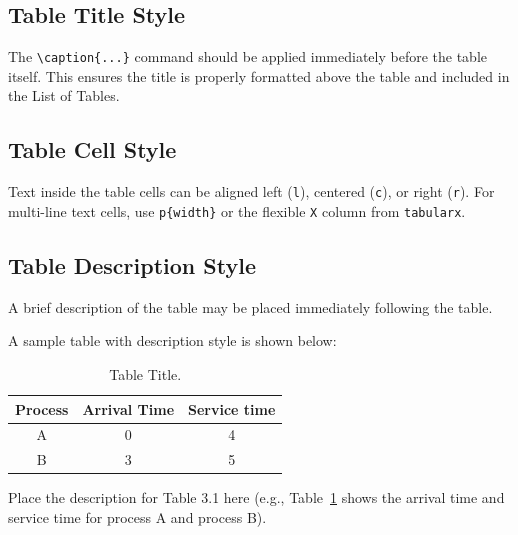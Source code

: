 \subsection{Table Title Style}
\label{sec:table-title-style}

The \texttt{\textbackslash caption\{...\}} command should be applied immediately before the table itself. This ensures the title is properly formatted above the table and included in the List of Tables.

\subsection{Table Cell Style}
\label{sec:table-cell-style}

Text inside the table cells can be aligned left (\texttt{l}), centered (\texttt{c}), or right (\texttt{r}). For multi-line text cells, use \texttt{p\{width\}} or the flexible \texttt{X} column from \texttt{tabularx}.

\subsection{Table Description Style}
\label{sec:table-desc-style}

A brief description of the table may be placed immediately following the table.

A sample table with description style is shown below:

\begin{table}[htbp]
  \centering
  \caption{Table Title.}
  \label{tab:sample-process-table}
  \begin{tabular}{ccc}
    \toprule
    \textbf{Process} & \textbf{Arrival Time} & \textbf{Service time} \\
    \midrule
    A & 0 & 4 \\
    \midrule
    B & 3 & 5 \\
    \bottomrule
  \end{tabular}
\end{table}

Place the description for Table 3.1 here (e.g., Table~\ref{tab:sample-process-table} shows the arrival time and service time for process A and process B).
